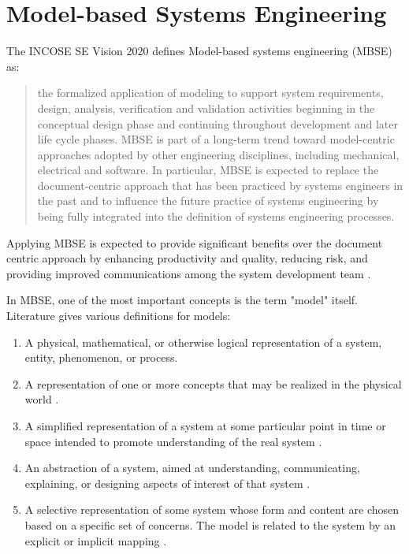 \section{Model-based Systems Engineering}\label{sec:mbse}

The INCOSE SE Vision 2020 \cite{incose-systems-engineering-2020} defines Model-based systems engineering (MBSE) as:

\blockquote{the formalized application of modeling to support system requirements, design, analysis, verification and validation activities beginning in the conceptual design phase and continuing throughout development and later life cycle phases. MBSE is part of a long-term trend toward model-centric approaches adopted by other engineering disciplines, including mechanical, electrical and software. In particular, MBSE is expected to replace the document-centric approach that has been practiced by systems engineers in the past and to influence the future practice of systems engineering by being fully integrated into the definition of systems engineering processes.}

Applying MBSE is expected to provide significant benefits over the document centric approach by enhancing productivity and quality, reducing risk, and providing improved communications among the system development team \cite{omgwiki}.

In MBSE, one of the most important concepts is the term "model" itself. Literature gives various definitions for models:

\begin{enumerate}
	\item A physical, mathematical, or otherwise logical representation of a system, entity, phenomenon, or process.\cite{DoD_modeling_and_simulation}\label{item:dod}
	\item A representation of one or more concepts that may be realized in the physical world \cite{sysml_practical_guide}.
	\item A simplified representation of a system at some particular point in time or space intended to promote understanding of the real system \cite{modsim}.
	\item An abstraction of a system, aimed at understanding, communicating, explaining, or designing aspects of interest of that system \cite{object-process-methodology}.
	\item A selective representation of some system whose form and content are chosen based on a specific set of concerns. The model is related to the system by an explicit or implicit mapping \cite{ORMSC/2010-09-06}.
\end{enumerate}

